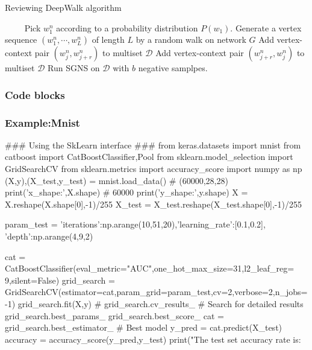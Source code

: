 \documentclass[UTF8, aspectratio=169 , 10pt，punct=kaiming]{beamer} %
\begin{document}
\begin{frame}{Reviewing DeepWalk algorithm}
  \begin{algorithm}[H]
    \caption{Reviewing random walk + skip gram}%
    \LinesNumbered %
     {
      　　 Pick $w_{1}^{n}$ according to a probability distribution $P\left(w_{1}\right)$.
          Generate a vertex sequence $\left(w_{1}^{n}, \cdots, w_{L}^{n}\right)$ of length $L$ by a random walk on network $G$ \;
           {
             {
              Add vertex-context pair $\left(w_{j}^{n}, w_{j+r}^{n}\right)$ to multiset $\mathcal{D}$ \;
              Add vertex-context pair $\left(w_{j+r}^{n}, w_{j}^{n}\right)$ to multiset $\mathcal{D}$
            }
          }
    }
    Run SGNS on $ \mathcal{D}$ with $b$  negative samplpes.
  \end{algorithm}
\end{frame}

\begin{frame}[fragile]
  \frametitle{Code blocks}

  \frametitle{Example:Mnist}
  \begin{python}
### Using the SkLearn interface ###
from keras.datasets import mnist
from catboost import CatBoostClassifier,Pool
from sklearn.model_selection import GridSearchCV
from sklearn.metrics import accuracy_score
import numpy as np
(X,y),(X_test,y_test) = mnist.load_data()
# (60000,28,28)
print('x_shape:',X.shape)
# 60000
print('y_shape:',y.shape)
X = X.reshape(X.shape[0],-1)/255
X_test = X_test.reshape(X_test.shape[0],-1)/255

param_test = {'iterations':np.arange(10,51,20),'learning_rate':[0.1,0.2],
        'depth':np.arange(4,9,2)}

cat = CatBoostClassifier(eval_metric="AUC",one_hot_max_size=31,l2_leaf_reg= 9,silent=False)
grid_search = GridSearchCV(estimator=cat,param_grid=param_test,cv=2,verbose=2,n_jobs=-1)
grid_search.fit(X,y)
# grid_search.cv_results_  # Search for detailed results
grid_search.best_params_
grid_search.best_score_
cat = grid_search.best_estimator_  # Best model
y_pred = cat.predict(X_test)
accuracy = accuracy_score(y_pred,y_test)
print("The test set accuracy rate is:%
\end{python}

\end{frame}
\end{document}
